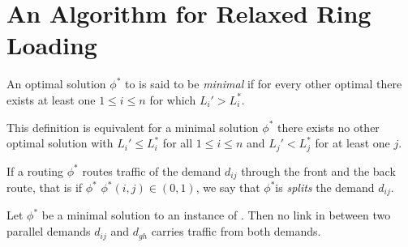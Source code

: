 \section{An Algorithm for Relaxed Ring Loading}

\begin{definition}
	An optimal solution $\phi^\ast$ to \RRL is said to be \emph{minimal} if for every other optimal there exists at least one $1 \leq i \leq n$ for which $L_i' > L_i^\ast$.
\end{definition}
This definition is equivalent for a minimal solution $\phi^\ast$ there exists no other optimal solution with $L_i' \leq L_i^\ast$ for all $1 \leq i \leq n$ and $L_j' < L_j^\ast$ for at least one $j$.

If a routing $\phi^\ast$ routes traffic of the demand $d_{ij}$ through the front and the back route, that is if $\phi^\ast$ $\phi^\ast(i, j) \in (0, 1)$, we say that $\phi^\ast$is \emph{splits} the demand $d_{ij}$.

\begin{theorem}
	\label{theo:parallel-demands-non-crossing}
	Let $\phi^\ast$ be a minimal solution to an instance of \RRL.
	Then no link in between two parallel demands $d_{ij}$ and $d_{gh}$ carries traffic from both demands.
\end{theorem}

